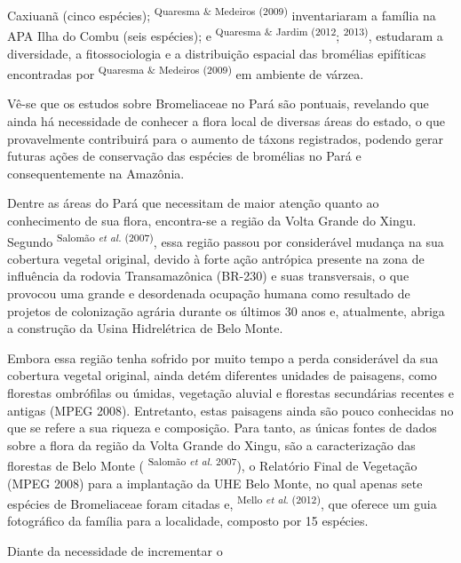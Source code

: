 \begin{multicols}{2}
Caxiuanã (\allowbreak{}cinco espécies)\allowbreak{}; \textsuperscript{Quaresma \&\allowbreak{\allowbreak{}\allowbreak{}}\allowbreak{} Medeiros (\allowbreak{}2009)\allowbreak{} } inventariaram a família na APA Ilha do Combu (\allowbreak{}seis espécies)\allowbreak{}; e \textsuperscript{Quaresma \&\allowbreak{\allowbreak{}\allowbreak{}}\allowbreak{} Jardim (\allowbreak{}2012}; \textsuperscript{2013)\allowbreak{}},\allowbreak{} estudaram a diversidade,\allowbreak{} a fitossociologia e a distribuição espacial das bromélias epifíticas encontradas por \textsuperscript{Quaresma \&\allowbreak{\allowbreak{}\allowbreak{}}\allowbreak{} Medeiros (\allowbreak{}2009)\allowbreak{}} em ambiente de várzea.\allowbreak{}\par{}Vê-\allowbreak{}se que os estudos sobre Bromeliaceae no Pará são pontuais,\allowbreak{} revelando que ainda há necessidade de conhecer a flora local de diversas áreas do estado,\allowbreak{} o que provavelmente contribuirá para o aumento de táxons registrados,\allowbreak{} podendo gerar futuras ações de conservação das espécies de bromélias no Pará e consequentemente na Amazônia.\allowbreak{}\par{}Dentre as áreas do Pará que necessitam de maior atenção quanto ao conhecimento de sua flora,\allowbreak{} encontra-\allowbreak{}se a região da Volta Grande do Xingu.\allowbreak{} Segundo \textsuperscript{Salomão \textit{et al.\allowbreak{}} (\allowbreak{}2007)\allowbreak{}},\allowbreak{} essa região passou por considerável mudança na sua cobertura vegetal original,\allowbreak{} devido à forte ação antrópica presente na zona de influência da rodovia Transamazônica (\allowbreak{}BR-\allowbreak{}230)\allowbreak{} e suas transversais,\allowbreak{} o que provocou uma grande e desordenada ocupação humana como resultado de projetos de colonização agrária durante os últimos 30 anos e,\allowbreak{} atualmente,\allowbreak{} abriga a construção da Usina Hidrelétrica de Belo Monte.\allowbreak{}\par{}Embora essa região tenha sofrido por muito tempo a perda considerável da sua cobertura vegetal original,\allowbreak{} ainda detém diferentes unidades de paisagens,\allowbreak{} como florestas ombrófilas ou úmidas,\allowbreak{} vegetação aluvial e florestas secundárias recentes e antigas (\allowbreak{}MPEG 2008)\allowbreak{}.\allowbreak{} Entretanto,\allowbreak{} estas paisagens ainda são pouco conhecidas no que se refere a sua riqueza e composição.\allowbreak{} Para tanto,\allowbreak{} as únicas fontes de dados sobre a flora da região da Volta Grande do Xingu,\allowbreak{} são a caracterização das florestas de Belo Monte (\allowbreak{} \textsuperscript{Salomão \textit{et al.\allowbreak{}} 2007})\allowbreak{},\allowbreak{} o Relatório Final de Vegetação (\allowbreak{}MPEG 2008)\allowbreak{} para a implantação da UHE Belo Monte,\allowbreak{} no qual apenas sete espécies de Bromeliaceae foram citadas e,\allowbreak{} \textsuperscript{Mello \textit{et al}.\allowbreak{} (\allowbreak{}2012)\allowbreak{}},\allowbreak{} que oferece um guia fotográfico da família para a localidade,\allowbreak{} composto por 15 espécies.\allowbreak{}\par{}Diante da necessidade de incrementar o 
\end{multicols}
